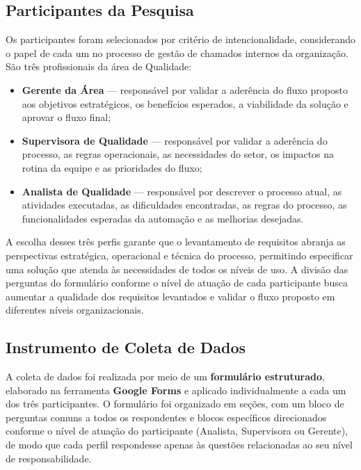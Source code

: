 \subsection{Participantes da Pesquisa}

Os participantes foram selecionados por critério de
intencionalidade, considerando o papel de cada um no processo
de gestão de chamados internos da organização. São três
profissionais da área de Qualidade:

\begin{itemize}
    \item \textbf{Gerente da Área} --- responsável por
    validar a aderência do fluxo proposto aos objetivos
    estratégicos, os benefícios esperados, a viabilidade da
    solução e aprovar o fluxo final;

    \item \textbf{Supervisora de Qualidade} --- responsável
    por validar a aderência do processo, as regras
    operacionais, as necessidades do setor, os impactos na
    rotina da equipe e as prioridades do fluxo;

    \item \textbf{Analista de Qualidade} --- responsável por
    descrever o processo atual, as atividades executadas, as
    dificuldades encontradas, as regras do processo, as
    funcionalidades esperadas da automação e as melhorias
    desejadas.
\end{itemize}

A escolha desses três perfis garante que o levantamento de
requisitos abranja as perspectivas estratégica, operacional e
técnica do processo, permitindo especificar uma solução que
atenda às necessidades de todos os níveis de uso. A divisão
das perguntas do formulário conforme o nível de atuação de
cada participante busca aumentar a qualidade dos requisitos
levantados e validar o fluxo proposto em diferentes níveis
organizacionais.

\subsection{Instrumento de Coleta de Dados}

A coleta de dados foi realizada por meio de um
\textbf{formulário estruturado}, elaborado na ferramenta
\textbf{Google Forms} e aplicado individualmente a cada um dos
três participantes. O formulário foi organizado em seções,
com um bloco de perguntas comuns a todos os respondentes e
blocos específicos direcionados conforme o nível de atuação
do participante (Analista, Supervisora ou Gerente), de modo
que cada perfil respondesse apenas às questões relacionadas ao
seu nível de responsabilidade.

